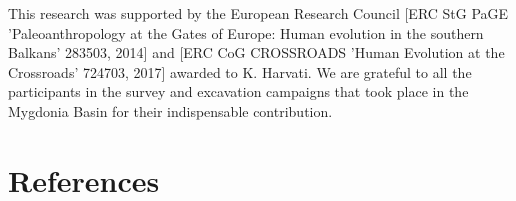 \documentclass[5p,times,authoryear]{elsarticle}
\begin{document}
This research was supported by the European Research Council [ERC StG PaGE 'Paleoanthropology at the Gates of Europe: Human evolution in the southern Balkans' 283503, 2014] and [ERC CoG CROSSROADS 'Human Evolution at the Crossroads' 724703, 2017] awarded to K. Harvati. We are grateful to all the participants in the survey and excavation campaigns that took place in the Mygdonia Basin for their indispensable contribution. %
 
\section*{References}





\end{document}
